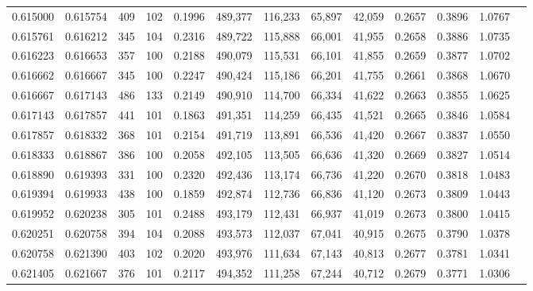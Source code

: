 \begin{tabular}{rrrrrrrrrrrrr}
0.615000 & 0.615754 &    409 &   102 &                                     0.1996 & 489,377 & 116,233 &  65,897 &  42,059 & 0.2657 & 0.3896 & 1.0767 \\
0.615761 & 0.616212 &    345 &   104 &                                     0.2316 & 489,722 & 115,888 &  66,001 &  41,955 & 0.2658 & 0.3886 & 1.0735 \\
0.616223 & 0.616653 &    357 &   100 &                                     0.2188 & 490,079 & 115,531 &  66,101 &  41,855 & 0.2659 & 0.3877 & 1.0702 \\
0.616662 & 0.616667 &    345 &   100 &                                     0.2247 & 490,424 & 115,186 &  66,201 &  41,755 & 0.2661 & 0.3868 & 1.0670 \\
0.616667 & 0.617143 &    486 &   133 &                                     0.2149 & 490,910 & 114,700 &  66,334 &  41,622 & 0.2663 & 0.3855 & 1.0625 \\
0.617143 & 0.617857 &    441 &   101 &                                     0.1863 & 491,351 & 114,259 &  66,435 &  41,521 & 0.2665 & 0.3846 & 1.0584 \\
0.617857 & 0.618332 &    368 &   101 &                                     0.2154 & 491,719 & 113,891 &  66,536 &  41,420 & 0.2667 & 0.3837 & 1.0550 \\
0.618333 & 0.618867 &    386 &   100 &                                     0.2058 & 492,105 & 113,505 &  66,636 &  41,320 & 0.2669 & 0.3827 & 1.0514 \\
0.618890 & 0.619393 &    331 &   100 &                                     0.2320 & 492,436 & 113,174 &  66,736 &  41,220 & 0.2670 & 0.3818 & 1.0483 \\
0.619394 & 0.619933 &    438 &   100 &                                     0.1859 & 492,874 & 112,736 &  66,836 &  41,120 & 0.2673 & 0.3809 & 1.0443 \\
0.619952 & 0.620238 &    305 &   101 &                                     0.2488 & 493,179 & 112,431 &  66,937 &  41,019 & 0.2673 & 0.3800 & 1.0415 \\
0.620251 & 0.620758 &    394 &   104 &                                     0.2088 & 493,573 & 112,037 &  67,041 &  40,915 & 0.2675 & 0.3790 & 1.0378 \\
0.620758 & 0.621390 &    403 &   102 &                                     0.2020 & 493,976 & 111,634 &  67,143 &  40,813 & 0.2677 & 0.3781 & 1.0341 \\
0.621405 & 0.621667 &    376 &   101 &                                     0.2117 & 494,352 & 111,258 &  67,244 &  40,712 & 0.2679 & 0.3771 & 1.0306 \\

\end{tabular}
